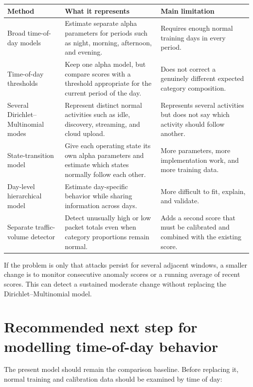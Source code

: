 \documentclass[11pt,a4paper]{article}
\begin{document}
\begin{table}[htbp]
\centering
\small
\begin{tabular}{p{}p{}p{}}
\toprule
Method & What it represents & Main limitation \\
\midrule
Broad time-of-day models
& Estimate separate alpha parameters for periods such as night, morning,
  afternoon, and evening.
& Requires enough normal training days in every period. \\
\addlinespace
Time-of-day thresholds
& Keep one alpha model, but compare scores with a threshold appropriate for
  the current period of the day.
& Does not correct a genuinely different expected category composition. \\
\addlinespace
Several Dirichlet--Multinomial modes
& Represent distinct normal activities such as idle, discovery, streaming,
  and cloud upload.
& Represents several activities but does not say which activity should follow
  another. \\
\addlinespace
State-transition model
& Give each operating state its own alpha parameters and estimate which states
  normally follow each other.
& More parameters, more implementation work, and more training data. \\
\addlinespace
Day-level hierarchical model
& Estimate day-specific behavior while sharing information across days.
& More difficult to fit, explain, and validate. \\
\addlinespace
Separate traffic-volume detector
& Detect unusually high or low packet totals even when category proportions
  remain normal.
& Adds a second score that must be calibrated and combined with the existing
  score. \\
\bottomrule
\end{tabular}
\end{table}

If the problem is only that attacks persist for several adjacent windows, a
smaller change is to monitor consecutive anomaly scores or a running average of
recent scores.  This can detect a sustained moderate change without replacing
the Dirichlet--Multinomial model.

\section{Recommended next step for modelling time-of-day behavior}

The present model should remain the comparison baseline.  Before replacing it,
normal training and calibration data should be examined by time of day:
\end{document}
